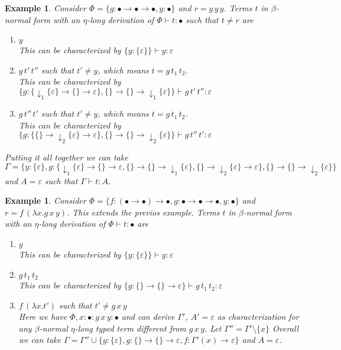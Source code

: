 \documentclass[10pt,a4paper]{article}
\theoremstyle{plain}%
\newtheorem{example}[theorem]{Example}
\begin{document}
\begin{example}
Consider $\Phi = \{g : \bullet \to \bullet \to \bullet, y : \bullet\}$ and $r = g\,y\,y$.
Terms $t$ in $\beta$-normal form with an $\eta$-long derivation of $\Phi \vdash t : \bullet$ such that $t \neq r$ are
\begin{enumerate}
\item $y$\\
This can be characterized by $\{y : \{\varepsilon\}\} \vdash y : \varepsilon$
\item $g\,t'\,t''$ such that $t' \neq y$, which means $t = g\,t_1\,t_2$.\\
This can be characterized by $\{g : \{{\downarrow_1}\{\varepsilon\} \to \{\} \to \varepsilon\}, \{\} \to \{\} \to {\downarrow_1}\{\varepsilon\} \} \vdash g\,t'\,t'' : \varepsilon$
\item $g\,t''\,t'$ such that $t' \neq y$, which means $t = g\,t_1\,t_2$.\\
This can be characterized by $\{g : \{\{\} \to {\downarrow_2}\{\varepsilon\} \to \varepsilon\}, \{\} \to \{\} \to {\downarrow_2}\{\varepsilon\} \} \vdash g\,t''\,t' : \varepsilon$
\end{enumerate}
Putting it all together we can take $\Gamma = \{y : \{\varepsilon\}, g : \{{\downarrow_1}\{\varepsilon\} \to \{\} \to \varepsilon, \{\} \to \{\} \to {\downarrow_1}\{\varepsilon\}, \{\} \to {\downarrow_2}\{\varepsilon\} \to \varepsilon\}, \{\} \to \{\} \to {\downarrow_2}\{\varepsilon\}\}$ and $A = \varepsilon$ such that $\Gamma \vdash t : A$.
\end{example}

\begin{example}
Consider $\Phi = \{f : (\bullet \to \bullet) \to \bullet, g : \bullet \to \bullet \to \bullet, y : \bullet\}$ and $r = f\,(\lambda x.g\,x\,y)$.
This extends the previos example.
Terms $t$ in $\beta$-normal form with an $\eta$-long derivation of $\Phi \vdash t : \bullet$ are
\begin{enumerate}
\item $y$\\
This can be characterized by $\{y : \{\varepsilon\}\} \vdash y : \varepsilon$
\item $g\,t_1\,t_2$\\
This can be characterized by $\{g : \{\} \to \{\} \to \varepsilon \} \vdash g\,t_1\,t_2 : \varepsilon$
\item $f\,(\lambda x.t')$ such that $t' \neq g\,x\,y$\\
Here we have $\Phi, x : \bullet : g\,x\,y : \bullet$ and can derive $\Gamma'$, $A' = \varepsilon$ as characterization for any $\beta$-normal $\eta$-long typed term different from $g\,x\,y$.
Let $\Gamma'' = \Gamma' \setminus \{x\}$
Overall we can take $\Gamma = \Gamma'' \cup \{y : \{\varepsilon\}, g : \{\} \to \{\} \to \varepsilon, f : \Gamma'(x) \to \varepsilon\}$ and $A = \varepsilon$.
\end{enumerate}
\end{example}
\end{document}
